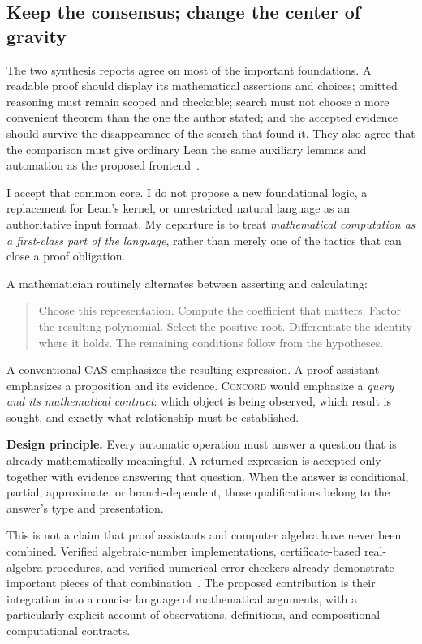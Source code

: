 \documentclass[11pt,a4paper]{article}
\newcommand{\Concord}{\textsc{Concord}}
\theoremstyle{definition}
\begin{document}
\subsection{Keep the consensus; change the center of gravity}
The two synthesis reports agree on most of the important foundations. A readable proof should display its mathematical assertions and choices; omitted reasoning must remain scoped and checkable; search must not choose a more convenient theorem than the one the author stated; and the accepted evidence should survive the disappearance of the search that found it. They also agree that the comparison must give ordinary Lean the same auxiliary lemmas and automation as the proposed frontend~\cite{synA,synB}.

I accept that common core. I do not propose a new foundational logic, a replacement for Lean's kernel, or unrestricted natural language as an authoritative input format. My departure is to treat \emph{mathematical computation as a first-class part of the language}, rather than merely one of the tactics that can close a proof obligation.

A mathematician routinely alternates between asserting and calculating:
\begin{quote}
Choose this representation. Compute the coefficient that matters. Factor the resulting polynomial. Select the positive root. Differentiate the identity where it holds. The remaining conditions follow from the hypotheses.
\end{quote}
A conventional CAS emphasizes the resulting expression. A proof assistant emphasizes a proposition and its evidence. \Concord{} would emphasize a \emph{query and its mathematical contract}: which object is being observed, which result is sought, and exactly what relationship must be established.

\begin{thesisbox}
\textbf{Design principle.} Every automatic operation must answer a question that is already mathematically meaningful. A returned expression is accepted only together with evidence answering that question. When the answer is conditional, partial, approximate, or branch-dependent, those qualifications belong to the answer's type and presentation.
\end{thesisbox}

This is not a claim that proof assistants and computer algebra have never been combined. Verified algebraic-number implementations, certificate-based real-algebra procedures, and verified numerical-error checkers already demonstrate important pieces of that combination~\cite{algnums,univariate,flover}. The proposed contribution is their integration into a concise language of mathematical arguments, with a particularly explicit account of observations, definitions, and compositional computational contracts.
\end{document}
